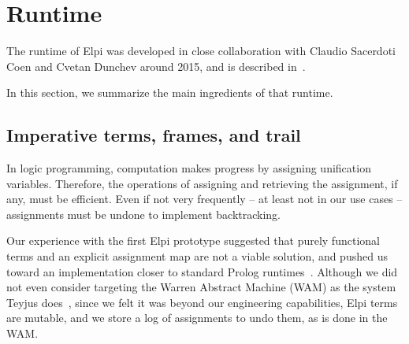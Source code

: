 \documentclass{these-ISSS}
\begin{document}
\section{Runtime}

The runtime of Elpi was developed in close collaboration with Claudio
Sacerdoti Coen and Cvetan Dunchev around 2015, and is described
in~\cite{dunchev15lpar}.

In this section, we summarize the main ingredients of that runtime.

\subsection{Imperative terms, frames, and trail}\label{sec:terms}

In logic programming, computation makes progress by assigning unification
variables. Therefore, the operations of assigning and retrieving the assignment,
if any, must be efficient. Even if not very frequently -- at least not in our use
cases -- assignments must be undone to implement backtracking.

Our experience with the first Elpi prototype suggested that purely functional
terms and an explicit assignment map are not a viable solution, and pushed us
toward an implementation closer to standard Prolog runtimes~\cite{wam}.
Although we did not even consider targeting the Warren Abstract Machine (WAM)
as the system Teyjus does~\cite{teyjus}, since we felt it was beyond our
engineering capabilities, Elpi terms are mutable, and we store a log of
assignments to undo them, as is done in the WAM.
\end{document}
